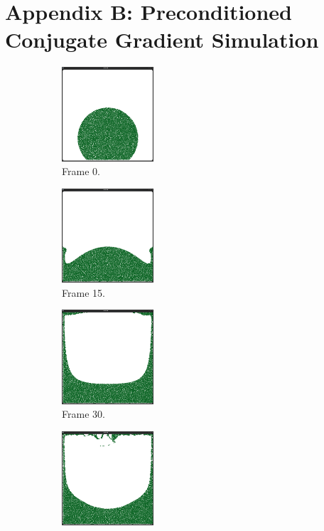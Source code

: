 \section*{Appendix B: Preconditioned Conjugate Gradient Simulation}
\begin{figure}[ht!]
\centering
\begin{subfigure}[]{0.3\textwidth}
\includegraphics[height=35mm]{png/pcg0.png}
\caption{Frame 0.}
\end{subfigure}
\begin{subfigure}[]{0.3\textwidth}
\includegraphics[height=35mm]{png/pcg1.png}
\caption{Frame 15.}
\end{subfigure}
\begin{subfigure}[]{0.3\textwidth}
\includegraphics[height=35mm]{png/pcg2.png}
\caption{Frame 30.}
\end{subfigure}
\begin{subfigure}[]{0.3\textwidth}
\includegraphics[height=35mm]{png/pcg3.png}

\end{subfigure}
\end{figure}
